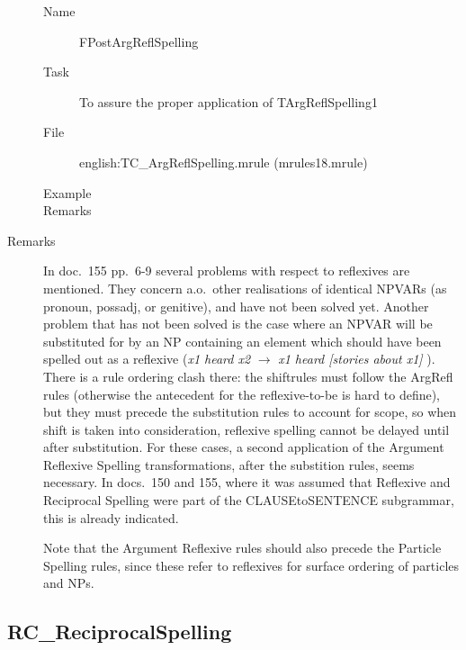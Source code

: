 \begin{description}
\vspace{1 cm}
\begin{description}
\item[Name] FPostArgReflSpelling
\item[Task] To assure the proper application of TArgReflSpelling1
\item[File] english:TC\_ArgReflSpelling.mrule (mrules18.mrule)
\item[Example] 
\item[Remarks]
\end{description}

\item[Remarks] In doc.\ 155 pp.\ 6-9 several problems with respect to 
reflexives are mentioned. They concern a.o.\ other realisations of 
identical NPVARs 
(as pronoun, possadj, or genitive), and have not been solved yet. Another 
problem that has not been solved is the case where an NPVAR will be substituted 
for by an NP containing an element which should have been spelled out as a 
reflexive ({\em x1 heard x2} $\rightarrow$ {\em x1 heard [stories about x1] }).
There is a rule ordering clash there: the shiftrules must follow the ArgRefl 
rules (otherwise the antecedent for the reflexive-to-be is hard to 
define), but they must precede the substitution rules to account for scope, so 
when shift is taken into consideration, reflexive spelling cannot be delayed 
until after substitution.
For these cases, a second application of the Argument Reflexive Spelling 
transformations, after the substition rules, seems necessary. In docs.\ 150 and 
155, 
where it was assumed that Reflexive and Reciprocal Spelling were part of the 
CLAUSEtoSENTENCE subgrammar, this is already indicated.

Note that the Argument Reflexive rules should also precede the Particle 
Spelling rules, since these refer to reflexives for surface ordering of 
particles and NPs.

\end{description}

\newpage
\subsection{RC\_ReciprocalSpelling}

